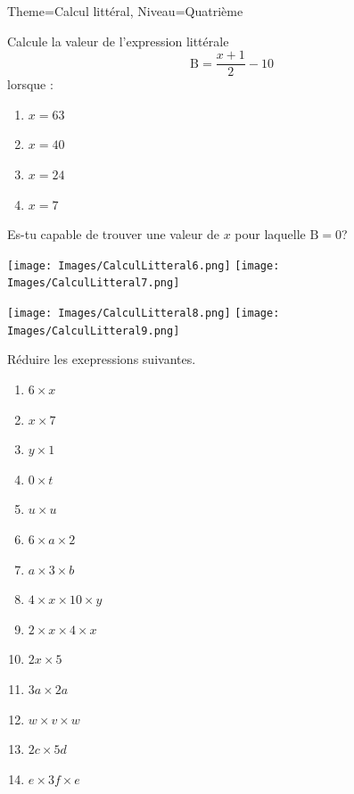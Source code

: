 \documentclass[11pt]{article}
\begin{document}
\begin{multicols}{2}
\begin{Maquette}[Fiche]{Theme=Calcul littéral, Niveau=Quatrième}
        \begin{exercice}
            Calcule la valeur de l’expression littérale
            \[
                \textrm{B} = \dfrac{x+1}{2} - 10
            \]
            lorsque :
            \begin{enumerate}
                \item $x=63$
                \item $x=40$
                \item $x=24$
                \item $x=7$
            \end{enumerate}

            Es-tu capable de trouver une valeur de $x$ pour laquelle $\textrm{B}=0$?
        \end{exercice}

        \columnbreak

        \begin{exercice}
            \texttt{[image: Images/CalculLitteral6.png]}
            \texttt{[image: Images/CalculLitteral7.png]}
        \end{exercice}

        \begin{exercice}
            \texttt{[image: Images/CalculLitteral8.png]}
            \texttt{[image: Images/CalculLitteral9.png]}
        \end{exercice}

        \begin{exercice}
            Réduire les exepressions suivantes.
            \begin{multicols}{2}
                \begin{enumerate}[label=\textbf{\alph*.}]
                    \item $6\times x$
                    \item $x \times 7$
                    \item $y \times 1$
                    \item $0 \times t$
                    \item $u \times u$
                    \item $6\times a \times 2$
                    \item $a \times 3 \times b$
                    \item $4\times x \times 10\times y$
                    \item $2\times x \times 4 \times x$
                    \item $2x\times 5$
                    \item $3a \times 2a$
                    \item $w \times v \times w$
                    \item $2c \times 5d$
                    \item $e \times 3f \times e$
                \end{enumerate}
            \end{multicols}
        \end{exercice}


\end{Maquette}
\end{multicols}
\end{document}
